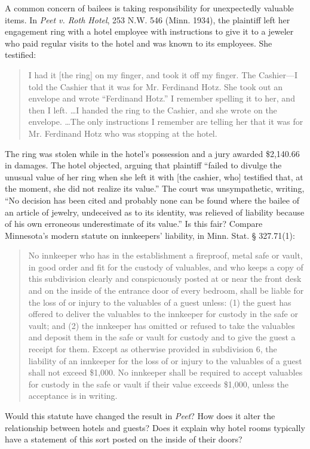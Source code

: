\item A common concern of bailees is taking responsibility for unexpectedly
valuable items. In \textit{Peet v. Roth Hotel}, 253 N.W. 546 (Minn. 1934), the
plaintiff left her engagement ring with a hotel employee with instructions to
give it to a jeweler who paid regular visits to the hotel and was known to its
employees. She testified:
\begin{quote}
I had it [the ring] on my finger, and took it off my finger.  The Cashier---I
told the Cashier that it was for Mr.  Ferdinand Hotz.  She took out an envelope
and wrote ``Ferdinand Hotz.'' I remember spelling it to her, and then I left. 
\ldots I handed the ring to the Cashier, and she wrote on the envelope.
\ldots The only instructions I remember are telling her that it was for Mr.
Ferdinand Hotz who was stopping at the hotel.
\end{quote}
The ring was stolen while in the hotel's possession and a jury awarded
\$2,140.66 in damages. The hotel objected, arguing that plaintiff ``failed to
divulge the unusual value of her ring when she left it with [the cashier, who]
testified that, at the moment, she did not realize its value.'' The court was
unsympathetic, writing, ``No decision has been cited and probably none can be
found where the bailee of an article of jewelry, undeceived as to its identity,
was relieved of liability because of his own erroneous underestimate of its
value.'' Is this fair? Compare Minnesota's modern statute on innkeepers'
liability, in Minn. Stat. {\S} 327.71(1):
\begin{quote}
No innkeeper who has in the establishment a fireproof, metal safe or vault, in
good order and fit for the custody of valuables, and who keeps a copy of this
subdivision clearly and conspicuously posted at or near the front desk and on
the inside of the entrance door of every bedroom, shall be liable for the loss
of or injury to the valuables of a guest unless: (1) the guest has offered to
deliver the valuables to the innkeeper for custody in the safe or vault; and
(2) the innkeeper has omitted or refused to take the valuables and deposit them
in the safe or vault for custody and to give the guest a receipt for them.
Except as otherwise provided in subdivision 6, the liability of an innkeeper
for the loss of or injury to the valuables of a guest shall not exceed \$1,000.
No innkeeper shall be required to accept valuables for custody in the safe or
vault if their value exceeds \$1,000, unless the acceptance is in writing.
\end{quote}
Would this statute have changed the result in \textit{Peet}? How does it alter
the relationship between hotels and guests? Does it explain why hotel rooms
typically have a statement of this sort posted on the inside of their doors?

